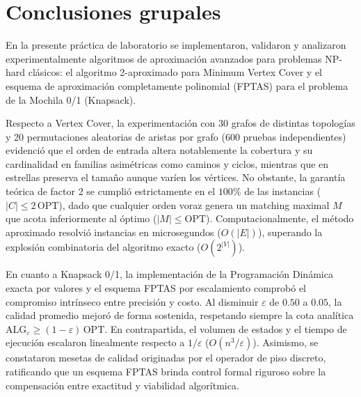 \section{Conclusiones grupales}

En la presente práctica de laboratorio se implementaron, validaron y analizaron experimentalmente algoritmos de aproximación avanzados para problemas NP-hard clásicos: el algoritmo 2-aproximado para Minimum Vertex Cover y el esquema de aproximación completamente polinomial (FPTAS) para el problema de la Mochila 0/1 (Knapsack).

Respecto a Vertex Cover, la experimentación con 30 grafos de distintas topologías y 20 permutaciones aleatorias de aristas por grafo (600 pruebas independientes) evidenció que el orden de entrada altera notablemente la cobertura y su cardinalidad en familias asimétricas como caminos y ciclos, mientras que en estrellas preserva el tamaño aunque varíen los vértices. No obstante, la garantía teórica de factor 2 se cumplió estrictamente en el $100\%$ de las instancias ($|C| \le 2\,\text{OPT}$), dado que cualquier orden voraz genera un matching maximal $M$ que acota inferiormente al óptimo ($|M| \le \text{OPT}$). Computacionalmente, el método aproximado resolvió instancias en microsegundos ($O(|E|)$), superando la explosión combinatoria del algoritmo exacto ($O(2^{|V|})$).

En cuanto a Knapsack 0/1, la implementación de la Programación Dinámica exacta por valores y el esquema FPTAS por escalamiento comprobó el compromiso intrínseco entre precisión y costo. Al disminuir $\varepsilon$ de $0.50$ a $0.05$, la calidad promedio mejoró de forma sostenida, respetando siempre la cota analítica $\text{ALG}_\varepsilon \ge (1 - \varepsilon)\,\text{OPT}$. En contrapartida, el volumen de estados y el tiempo de ejecución escalaron linealmente respecto a $1/\varepsilon$ ($O(n^3/\varepsilon)$). Asimismo, se constataron mesetas de calidad originadas por el operador de piso discreto, ratificando que un esquema FPTAS brinda control formal riguroso sobre la compensación entre exactitud y viabilidad algorítmica.


